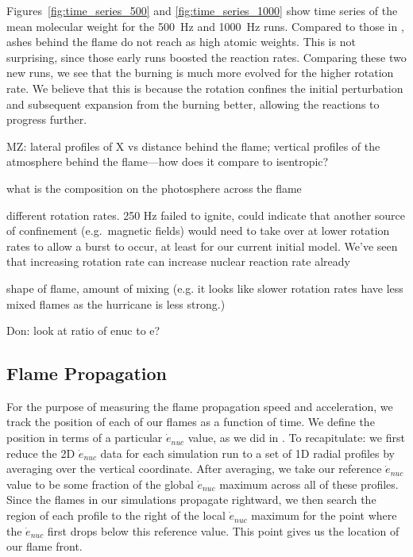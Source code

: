 \documentclass[preprint,times,tighten]{aastex63}
\newcommand{\enucdot}{\dot{e}_{nuc}}
\begin{document}
Figures~\ref{fig:time_series_500} and \ref{fig:time_series_1000} show
time series of the mean molecular weight for the 500~Hz and 1000~Hz
runs.  Compared to those in \cite{flame_wave1}, ashes behind the flame
do not reach as high atomic weights.  This is not surprising, since
those early runs boosted the reaction rates.  Comparing these two new
runs, we see that the burning is much more evolved for the higher
rotation rate.  We believe that this is because the rotation confines
the initial perturbation and subsequent expansion from the burning
better, allowing the reactions to progress further.

MZ: lateral profiles of X vs distance behind the flame; 
vertical profiles of the atmosphere behind the flame---how does it compare to isentropic?

what is the composition on the photosphere across the flame

different rotation rates. 250 Hz failed to ignite, could indicate that another source of confinement (e.g.\ magnetic fields) would need to take
over at lower rotation rates to allow a burst to occur, at least for our current initial model. We've seen that increasing rotation rate can
increase nuclear reaction rate already

shape of flame, amount of mixing (e.g. it looks like slower rotation rates have less mixed flames as the hurricane is less strong.)

Don: look at ratio of enuc to e?

\subsection{Flame Propagation}

For the purpose of measuring the flame propagation speed and acceleration, we track the position of each of our flames
as a function of time. We define the position in terms of a particular $\enucdot$ value, as we did in \citet{flame_wave1}.
To recapitulate: we first reduce the 2D $\enucdot$ data for each simulation run to a set of 1D radial profiles by averaging
over the vertical coordinate. After averaging, we take our reference $\enucdot$ value to be some fraction of the global $\enucdot$
maximum across all of these profiles. Since the flames in our simulations propagate rightward, we then search the region of
each profile to the right of the local $\enucdot$ maximum for the point where the $\enucdot$ first drops below this reference
value. This point gives us the location of our flame front.
\end{document}
